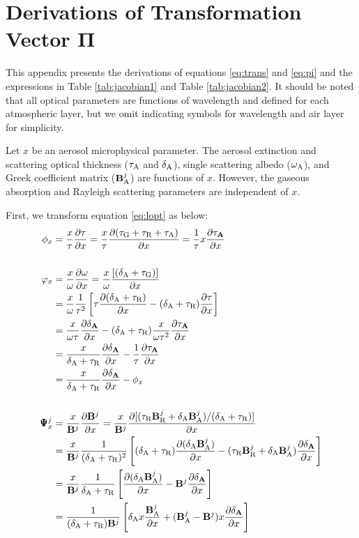 \chapter{Derivations of Transformation Vector $\pmb{\Pi}$} \label{app:pi}


This appendix presents the derivations of equations
\eqref{eq:trans} and \eqref{eq:pi} and the expressions in
Table \ref{tab:jacobian1} and Table \ref{tab:jacobian2}. It should be
noted that all optical parameters are functions of wavelength and
defined for each atmospheric layer, but we omit indicating symbols for
wavelength and air layer for simplicity.

Let $x$ be an aerosol microphysical parameter. The aerosol extinction and
scattering optical thickness ($\tau_\text{A}$ and $\delta_\text{A}$), single scattering albedo
($\omega_\text{A}$), and Greek coefficient matrix ($\mathbf{B}_\text{A}^j$) are functions of $x$. 
However, the gaseous absorption and Rayleigh scattering parameters are 
independent of $x$. 

First, we transform equation \eqref{eq:lopt} as below:
\begingroup
\allowdisplaybreaks
\begin{align}
\phi_x &= \frac{x}{\tau}\frac{\partial\tau}{\partial x} 
        = \frac{x}{\tau}\frac{\partial(\tau_\text{G}+\tau_\text{R}+\tau_\text{A})}{\partial x} 
        = \frac{1}{\tau}x\frac{\partial\tau_\mathbf{A}}{\partial x} \label{eq:phix1} \\
        \nonumber \\
\varphi_x 
        &= \frac{x}{\omega}\frac{\partial\omega}{\partial x} 
         = \frac{x}{\omega}\frac{[(\delta_\text{A}+\tau_\text{G})]}{\partial x}
         \nonumber \\
        &= \frac{x}{\omega}\frac{1}{\tau^2}
           \left[ \tau\frac{\partial{(\delta_\text{A}+\tau_\text{R})}}{\partial x}
                - (\delta_\text{A}+\tau_\text{R})\frac{\partial\tau}{\partial x}\right]
         \nonumber \\
        &= \frac{x}{\omega\tau}\frac{\partial\delta_\mathbf{A}}{\partial x}
           -(\delta_\text{A}+\tau_\text{R})\frac{x}{\omega\tau^2}\frac{\partial\tau_\mathbf{A}}{\partial x}
         \nonumber \\
        &= \frac{x}{\delta_\text{A}+\tau_\text{R}}\frac{\partial\delta_\mathbf{A}}{\partial x}
           -\frac{1}{\tau}\frac{\partial\tau_\mathbf{A}}{\partial x}
         \nonumber \\
        &= \frac{x}{\delta_\text{A}+\tau_\text{R}}\frac{\partial\delta_\mathbf{A}}{\partial x} - \phi_x \label{eq:phix2}\\
         \nonumber \\
\pmb{\Psi}_x^j 
        &= \frac{x}{\mathbf{B}^j}\frac{\partial\mathbf{B}^j}{\partial x} 
         = \frac{x}{\mathbf{B}^j}\frac{\partial{[(\tau_\text{R}\mathbf{B}_\text{R}^j+\delta_\text{A}\mathbf{B}_\text{A}^j)/(\delta_\text{A}+\tau_\text{R})]}}{\partial x}
         \nonumber \\
        &= \frac{x}{\mathbf{B}^j}\frac{1}{(\delta_\text{A}+\tau_\text{R})^2}\left[
           (\delta_\text{A}+\tau_\text{R})\frac{\partial(\delta_\text{A}\mathbf{B}_\text{A}^j)}{\partial x}
           - (\tau_\text{R}\mathbf{B}_\text{R}^j+\delta_\text{A}\mathbf{B}_\text{A}^j)\frac{\partial\delta_\mathbf{A}}{\partial x}\right]
         \nonumber \\
        &= \frac{x}{\mathbf{B}^j}\frac{1}{\delta_\text{A}+\tau_\text{R}} \left[
           \frac{\partial(\delta_\text{A}\mathbf{B}_\text{A}^j)}{\partial x}-\mathbf{B}^j\frac{\partial\delta_\mathbf{A}}{\partial x}\right]
         \nonumber \\
        &= \frac{1}{(\delta_\text{A}+\tau_\text{R})\mathbf{B}^j} \left[ 
           \delta_\text{A} x\frac{\mathbf{B}_\text{A}^j}{\partial x}+(\mathbf{B}_\text{A}^j-\mathbf{B}^j)x\frac{\partial\delta_\mathbf{A}}{\partial x}
           \right] \label{eq:phix3}
\end{align}
\endgroup

